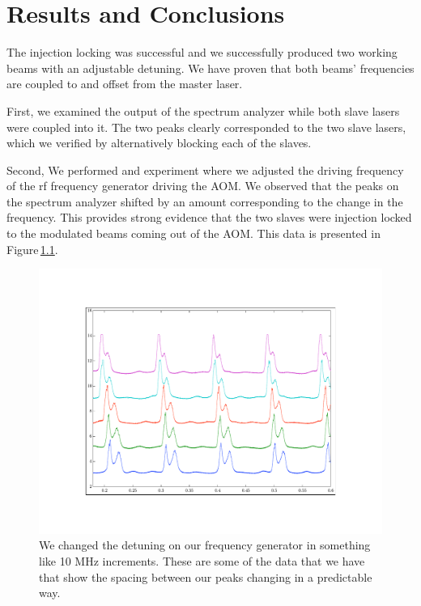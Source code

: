 \chapter{Results and Conclusions}\label{triumphantDataChapter}

The injection locking was successful and we successfully produced two working beams with an adjustable detuning. We have proven that both beams' frequencies are coupled to and offset from the master laser.

First, we examined the output of the spectrum analyzer while both slave lasers were coupled into it. 
The two peaks clearly corresponded to the two slave lasers, which we verified by alternatively blocking each of the slaves. 



Second, We performed and experiment where we adjusted the driving frequency of the rf frequency generator driving the AOM. We observed that the peaks on the spectrum analyzer shifted by an amount corresponding to the change in the frequency. This provides strong evidence that the two slaves were injection locked to the modulated beams coming out of the AOM. This data is presented in Figure\,\ref{fig:typicaldata}.



 
\begin{figure}
    \centerline{\includegraphics{sampleOffsetData}}
    \caption[]{\label{fig:typicaldata}
    We changed the detuning on our frequency generator in something like 10 MHz increments. These are some of the data that we have that show the spacing between our peaks changing in a predictable way.}
\end{figure}

